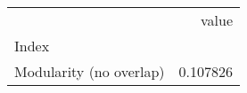 \begin{tabular}{lr}
\toprule
{} &     value \\
Index                   &           \\
\midrule
Modularity (no overlap) &  0.107826 \\
\bottomrule
\end{tabular}
